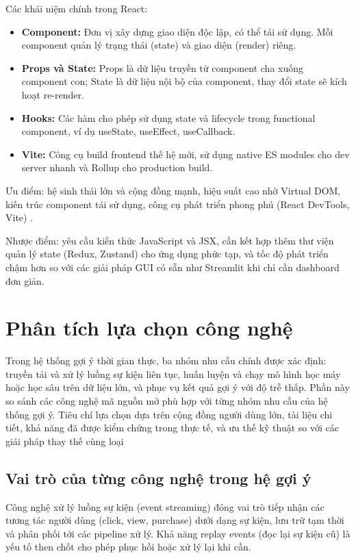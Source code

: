 \documentclass[../BTL.tex]{subfiles}
\begin{document}
Các khái niệm chính trong React:
\begin{itemize}
    \item \textbf{Component:} Đơn vị xây dựng giao diện độc lập, có thể tái sử dụng. Mỗi component quản lý trạng thái (state) và giao diện (render) riêng.
    \item \textbf{Props và State:} Props là dữ liệu truyền từ component cha xuống component con; State là dữ liệu nội bộ của component, thay đổi state sẽ kích hoạt re-render.
    \item \textbf{Hooks:} Các hàm cho phép sử dụng state và lifecycle trong functional component, ví dụ useState, useEffect, useCallback.
    \item \textbf{Vite:} Công cụ build frontend thế hệ mới, sử dụng native ES modules cho dev server nhanh và Rollup cho production build.
\end{itemize}

Ưu điểm: hệ sinh thái lớn và cộng đồng mạnh, hiệu suất cao nhờ Virtual DOM, kiến trúc component tái sử dụng, công cụ phát triển phong phú (React DevTools, Vite) \cite{react_official}.

Nhược điểm: yêu cầu kiến thức JavaScript và JSX, cần kết hợp thêm thư viện quản lý state (Redux, Zustand) cho ứng dụng phức tạp, và tốc độ phát triển chậm hơn so với các giải pháp GUI có sẵn như Streamlit khi chỉ cần dashboard đơn giản.


\section{Phân tích lựa chọn công nghệ}
Trong hệ thống gợi ý thời gian thực, ba nhóm nhu cầu chính được xác định: truyền tải và xử lý luồng sự kiện liên tục, huấn luyện và chạy mô hình học máy hoặc học sâu trên dữ liệu lớn, và phục vụ kết quả gợi ý với độ trễ thấp. Phần này so sánh các công nghệ mã nguồn mở phù hợp với từng nhóm nhu cầu của hệ thống gợi ý. Tiêu chí lựa chọn dựa trên cộng đồng người dùng lớn, tài liệu chi tiết, khả năng đã được kiểm chứng trong thực tế, và ưu thế kỹ thuật so với các giải pháp thay thế cùng loại


\subsection{Vai trò của từng công nghệ trong hệ gợi ý}

Công nghệ xử lý luồng sự kiện (event streaming) đóng vai trò tiếp nhận các tương tác người dùng (click, view, purchase) dưới dạng sự kiện, lưu trữ tạm thời và phân phối tới các pipeline xử lý. Khả năng replay events (đọc lại sự kiện cũ) là yếu tố then chốt cho phép phục hồi hoặc xử lý lại khi cần.
\end{document}
